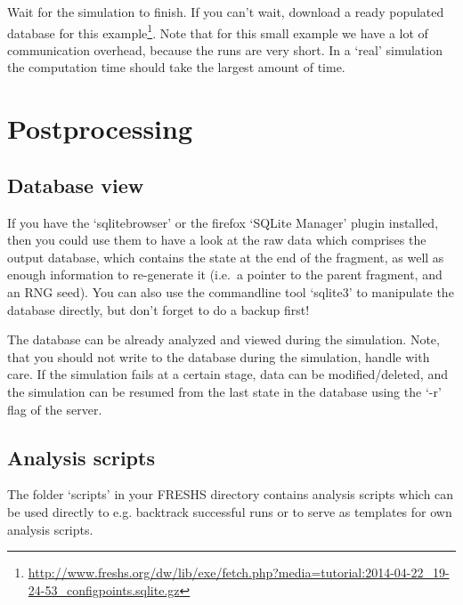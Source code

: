 \documentclass[a4paper,oneside]{article}
\begin{document}
Wait for the simulation to finish. If you can't wait, download a ready populated database for this example\footnote{\url{http://www.freshs.org/dw/lib/exe/fetch.php?media=tutorial:2014-04-22_19-24-53_configpoints.sqlite.gz}}. Note that for this small example we have a lot of communication overhead, because the runs are very short. In a `real' simulation the computation time should take the largest amount of time.


\section{Postprocessing}

\subsection{Database view}
If you have the `sqlitebrowser' or the firefox `SQLite Manager' plugin installed, then you could use them to have a look at the raw data which comprises the output database, which contains the state at the end of the fragment, as well as enough information to re-generate it (i.e.~a pointer to the parent fragment, and an RNG seed).
You can also use the commandline tool `sqlite3' to manipulate the database directly, but don't forget to do a backup first!

The database can be already analyzed and viewed during the simulation. Note, that you should not write to the database during the simulation, handle with care. If the simulation fails at a certain stage, data can be modified/deleted, and the simulation can be resumed from the last state in the database using the `-r' flag of the server.

\subsection{Analysis scripts}
The folder `scripts' in your FRESHS directory contains analysis scripts which can be used directly to e.g. backtrack successful runs or to serve as templates for own analysis scripts.
\end{document}
